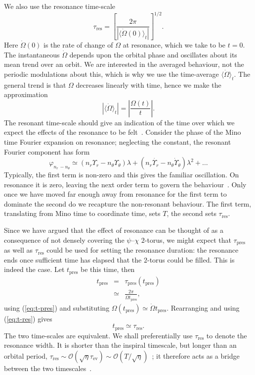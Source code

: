 \documentclass[aps,prd,amsfonts,amssymb,amsmath,nofootinbib,reprint,showpacs]{revtex4-1}
\newcommand{\eqnref}[1]{(\ref{eq:#1})}
\newcommand{\sub}[1]{\ensuremath{_\text{#1}}}
\newcommand{\order}[1]{\ensuremath{\mathcal{O}({#1})}}
\begin{document}
We also use the resonance time-scale
\begin{equation}
\tau\sub{res} = \left[\frac{2\pi}{\left|\langle\dot{\Omega}(0)\rangle_t\right|}\right]^{1/2}.
\label{eq:t-res}
\end{equation}
Here $\dot{\Omega}(0)$ is the rate of change of $\Omega$ at resonance, which we take to be $t = 0$. The instantaneous $\dot{\Omega}$ depends upon the orbital phase and oscillates about its mean trend over an orbit. We are interested in the averaged behaviour, not the periodic modulations about this, which is why we use the time-average $\langle\dot{\Omega}\rangle_t$. The general trend is that $\Omega$ decreases linearly with time, hence we make the approximation
\begin{equation}
\left|\langle\dot{\Omega}\rangle_t\right| = \left|\frac{\Omega(t)}{t}\right|.
\end{equation}
The resonant time-scale should give an indication of the time over which we expect the effects of the resonance to be felt~\cite{Bosley1992}. Consider the phase of the Mino time Fourier expansion on resonance; neglecting the constant, the resonant Fourier component has form
\begin{equation}
\varphi_{n_r\,-n_\theta} \simeq \left(n_r\Upsilon_r - n_\theta\Upsilon_\theta\right)\lambda + \left(n_r\dot{\Upsilon_r} - n_\theta\dot{\Upsilon}_\theta\right)\lambda^2 + \ldots
\end{equation}
Typically, the first term is non-zero and this gives the familiar oscillation. On resonance it is zero, leaving the next order term to govern the behaviour~\cite{Flanagan2012}. Only once we have moved far enough away from resonance for the first term to dominate the second do we recapture the non-resonant behaviour. The first term, translating from Mino time to coordinate time, sets $T$, the second sets $\tau\sub{res}$.

Since we have argued that the effect of resonance can be thought of as a consequence of not densely covering the $\psi$--$\chi$ $2$-torus, we might expect that $\tau\sub{pres}$ as well as $\tau\sub{res}$ could be used for setting the resonance duration: the resonance ends once sufficient time has elapsed that the $2$-torus could be filled. This is indeed the case. Let $t\sub{pres}$ be this time, then
\begin{eqnarray}
t\sub{pres} & = & \tau\sub{pres}(t\sub{pres}) \\
 & \simeq & \frac{2\pi}{\dot{\Omega}t\sub{pres}}, \nonumber 
\end{eqnarray}
using \eqnref{t-pres} and substituting $\Omega(t\sub{pres}) \simeq \dot{\Omega}t\sub{pres}$. Rearranging and using \eqnref{t-res} gives
\begin{equation}
t\sub{pres} \simeq \tau\sub{res}.
\end{equation}
The two time-scales are equivalent. We shall preferentially use $\tau\sub{res}$ to denote the resonance width. It is shorter than the inspiral timescale, but longer than an orbital period, $\tau\sub{res} \sim \order{\sqrt{\eta}\tau\sub{ev}} \sim \order{T/\sqrt{\eta}}$~\cite{Flanagan2012,Gair2011a}; it therefore acts as a bridge between the two timescales~\cite{Hinderer2008}.
\end{document}
